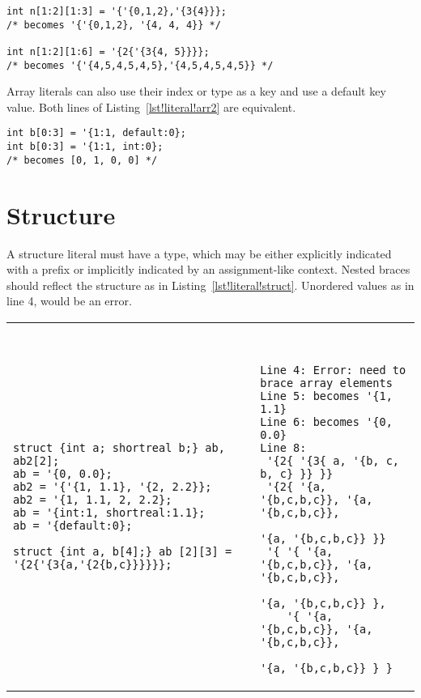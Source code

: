 \begin{lstlisting}[label=lst!literal!array, caption=Array Literal
    examples]
int n[1:2][1:3] = '{'{0,1,2},'{3{4}}};
/* becomes '{'{0,1,2}, '{4, 4, 4}} */

int n[1:2][1:6] = '{2{'{3{4, 5}}}};
/* becomes '{'{4,5,4,5,4,5},'{4,5,4,5,4,5}} */
\end{lstlisting}

Array literals can also use their index or type as a key and use a
default key value. Both lines of Listing~\ref{lst!literal!arr2} are
equivalent.
\begin{lstlisting}[label=lst!literal!arr2, caption=Array Literal with
    default value]
int b[0:3] = '{1:1, default:0};
int b[0:3] = '{1:1, int:0};
/* becomes [0, 1, 0, 0] */
\end{lstlisting}

\section{Structure}
A structure literal must have a type, which may be either explicitly
indicated with a prefix or implicitly indicated by an assignment-like
context. Nested braces should reflect the structure as in
Listing~\ref{lst!literal!struct}. Unordered values as in line 4, would
be an error.

\begin{table}
\begin{tabular}{p{} p{}}
\begin{lstlisting}[label=lst!literal!struct, caption=Structure Literals]
struct {int a; shortreal b;} ab, ab2[2];
ab = '{0, 0.0};
ab2 = '{'{1, 1.1}, '{2, 2.2}};
ab2 = '{1, 1.1, 2, 2.2};
ab = '{int:1, shortreal:1.1};
ab = '{default:0};

struct {int a, b[4];} ab [2][3] = '{2{'{3{a,'{2{b,c}}}}}};
\end{lstlisting}
&
\begin{tbldesc}
\begin{verbatim}


Line 4: Error: need to brace array elements
Line 5: becomes '{1, 1.1}
Line 6: becomes '{0, 0.0}
Line 8:
 '{2{ '{3{ a, '{b, c, b, c} }} }}
 '{2{ '{a, '{b,c,b,c}}, '{a, '{b,c,b,c}},
                      '{a, '{b,c,b,c}} }}
 '{ '{ '{a, '{b,c,b,c}}, '{a, '{b,c,b,c}},
                      '{a, '{b,c,b,c}} },
    '{ '{a, '{b,c,b,c}}, '{a, '{b,c,b,c}},
                      '{a, '{b,c,b,c}} } }
\end{verbatim}
\end{tbldesc}
\end{tabular}
\end{table}

